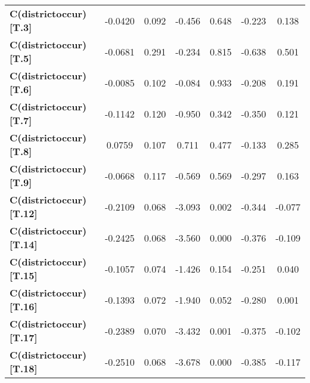 \begin{center}
\begin{tabular}{lcccccc}
\textbf{C(districtoccur)[T.3]}                                                    &      -0.0420  &        0.092     &    -0.456  &         0.648        &       -0.223    &        0.138     \\
\textbf{C(districtoccur)[T.5]}                                                    &      -0.0681  &        0.291     &    -0.234  &         0.815        &       -0.638    &        0.501     \\
\textbf{C(districtoccur)[T.6]}                                                    &      -0.0085  &        0.102     &    -0.084  &         0.933        &       -0.208    &        0.191     \\
\textbf{C(districtoccur)[T.7]}                                                    &      -0.1142  &        0.120     &    -0.950  &         0.342        &       -0.350    &        0.121     \\
\textbf{C(districtoccur)[T.8]}                                                    &       0.0759  &        0.107     &     0.711  &         0.477        &       -0.133    &        0.285     \\
\textbf{C(districtoccur)[T.9]}                                                    &      -0.0668  &        0.117     &    -0.569  &         0.569        &       -0.297    &        0.163     \\
\textbf{C(districtoccur)[T.12]}                                                   &      -0.2109  &        0.068     &    -3.093  &         0.002        &       -0.344    &       -0.077     \\
\textbf{C(districtoccur)[T.14]}                                                   &      -0.2425  &        0.068     &    -3.560  &         0.000        &       -0.376    &       -0.109     \\
\textbf{C(districtoccur)[T.15]}                                                   &      -0.1057  &        0.074     &    -1.426  &         0.154        &       -0.251    &        0.040     \\
\textbf{C(districtoccur)[T.16]}                                                   &      -0.1393  &        0.072     &    -1.940  &         0.052        &       -0.280    &        0.001     \\
\textbf{C(districtoccur)[T.17]}                                                   &      -0.2389  &        0.070     &    -3.432  &         0.001        &       -0.375    &       -0.102     \\
\textbf{C(districtoccur)[T.18]}                                                   &      -0.2510  &        0.068     &    -3.678  &         0.000        &       -0.385    &       -0.117     \\

\end{tabular}
\end{center}
